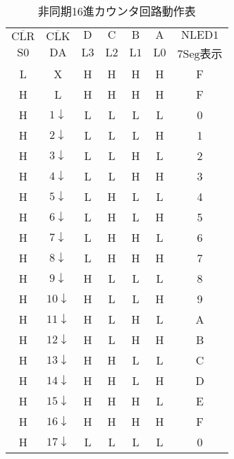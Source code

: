 \begin {table}[ht]
	\begin {center}
		\caption {非同期16進カウンタ回路動作表}%
		\begin {tabular}{cc|cccc|c}\hline
			\multicolumn{1}{c}{$\overline{\mathrm{CLR}}$}&
			\multicolumn{1}{c|}{$\overline{\mathrm{CLK}}$}&
			\multicolumn{1}{c}{$\mathrm{D}$}&
			\multicolumn{1}{c}{$\mathrm{C}$}&
			\multicolumn{1}{c}{$\mathrm{B}$}&
			\multicolumn{1}{c}{$\mathrm{A}$}&
			\multicolumn{1}{|c}{$\mathrm{NLED1}$}\\
			
			\multicolumn{1}{c}{$\mathrm{S0}$}&
			\multicolumn{1}{c|}{$\mathrm{DA}$}&
			\multicolumn{1}{c}{$\mathrm{L3}$}&
			\multicolumn{1}{c}{$\mathrm{L2}$}&
			\multicolumn{1}{c}{$\mathrm{L1}$}&
			\multicolumn{1}{c}{$\mathrm{L0}$}&
			\multicolumn{1}{|c}{$\mathrm{7Seg}$表示}\\
			\hline
			L	&	X	&	H	&	H	&	H	&	H	&	F	\\
			H	&	L	&	H	&	H	&	H	&	H	&	F	\\
			H	&	$1\downarrow$	&	L	&	L	&	L	&	L	&	0	\\
			H	&	$2\downarrow$	&	L	&	L	&	L	&	H	&	1	\\
			H	&	$3\downarrow$	&	L	&	L	&	H	&	L	&	2	\\
			H	&	$4\downarrow$	&	L	&	L	&	H	&	H	&	3	\\
			H	&	$5\downarrow$	&	L	&	H	&	L	&	L	&	4	\\
			H	&	$6\downarrow$	&	L	&	H	&	L	&	H	&	5	\\
			H	&	$7\downarrow$	&	L	&	H	&	H	&	L	&	6	\\
			H	&	$8\downarrow$	&	L	&	H	&	H	&	H	&	7	\\
			H	&	$9\downarrow$	&	H	&	L	&	L	&	L	&	8	\\
			H	&	$10\downarrow$	&	H	&	L	&	L	&	H	&	9	\\
			H	&	$11\downarrow$	&	H	&	L	&	H	&	L	&	A	\\
			H	&	$12\downarrow$	&	H	&	L	&	H	&	H	&	B	\\
			H	&	$13\downarrow$	&	H	&	H	&	L	&	L	&	C	\\
			H	&	$14\downarrow$	&	H	&	H	&	L	&	H	&	D	\\
			H	&	$15\downarrow$	&	H	&	H	&	H	&	L	&	E	\\
			H	&	$16\downarrow$	&	H	&	H	&	H	&	H	&	F	\\
			H	&	$17\downarrow$	&	L	&	L	&	L	&	L	&	0	\\
		\hline
		\end{tabular}
		\label {tab:16counter_dousahyoutab}%
	\end{center}
\end{table}


